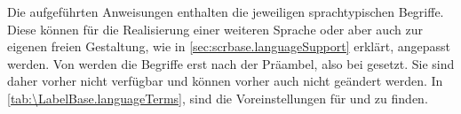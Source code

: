 \begin{Declaration}
\end{Declaration}
Die aufgeführten Anweisungen enthalten die jeweiligen sprachtypischen
Begriffe. Diese können für die Realisierung einer
weiteren Sprache oder aber auch zur eigenen freien Gestaltung, wie in
\autoref{sec:scrbase.languageSupport} erklärt, angepasst werden. Von
\KOMAScript{} werden die Begriffe erst nach der Präambel, also bei
 gesetzt. Sie sind daher vorher nicht
verfügbar und können vorher auch nicht geändert werden. In
\autoref{tab:\LabelBase.languageTerms},
 sind die Voreinstellungen
für  und  zu finden.%
